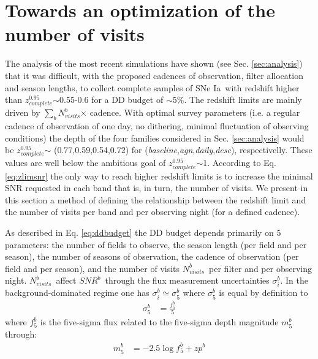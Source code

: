 \documentclass[\docopts]{\docclass}
\newcommand{\snrb}{\mbox{$SNR^b$}}
\newcommand{\sne}{{SNe Ia}}
\newcommand{\zcompb}{\mbox{$z_{complete}^{0.95}$}}
\newcommand{\per}{$\%$}
\newcommand{\seq}{$\sim$}
\newcommand{\nvisitsb}{\mbox{$N_{visits}^b$}}
\newcommand{\sumnvisitsb}{\mbox{$\sum\limits_{b}N_{visits}^b$}}
\newcommand{\osfamily}[1]{{\it #1}}
\begin{document}
\section{Towards an optimization of the number of visits}
\label{sec:opti}

The analysis of the most recent simulations have shown (see Sec. \ref{sec:analysis}) that it was difficult, with the proposed cadences of observation, filter allocation and season lengths, to collect complete samples of \sne~with redshift higher than \zcompb\seq 0.55-0.6 for a DD budget of \seq 5\per.  %
The redshift limits are mainly driven by \sumnvisitsb$\times$ cadence. With optimal survey parameters (i.e. a regular cadence of observation of one day, no dithering, minimal fluctuation of observing conditions) the depth of the four families considered in Sec. \ref{sec:analysis} would be \zcompb $\sim$ (0.77,0.59,0.54,0.72) for (\osfamily{baseline},\osfamily{agn},\osfamily{daily},\osfamily{desc}), respectivelly. These values are well below the ambitious goal of \zcompb\seq1. According to Eq. \ref{eq:zlimsnr} the only way to reach higher redshift limits is to increase the minimal SNR requested in each band that is, in turn, the number of visits. We present in this section a method of defining the relationship between the redshift limit and the number of visits per band and per observing night (for a defined cadence). 
\par
As described in Eq. \ref{eq:ddbudget} the DD budget depends primarily on 5 parameters: the number of fields to observe, the season length (per field and per season), the number of seasons of observation, the cadence of observation (per field and per season), and the number of visits \nvisitsb~per filter and per observing night. \nvisitsb~affect \snrb~through the flux measurement uncertainties  $\sigma_i^b$. In the background-dominated regime one has $\sigma_i^b \simeq \sigma_5^b$ where $\sigma_5^b$ is equal by definition to
\begin{equation}
  \begin{aligned}
    \sigma_5^b &=  \frac{f_5^b}{5}
    \end{aligned}
\end{equation}
where $f_ 5^b$ is the five-sigma flux related to the five-sigma depth magnitude $m_5^b$ through:
\begin{equation}
  \begin{aligned}
    m_5^b &= -2.5 \log f_5^b+zp^b
    \end{aligned}
\end{equation}
\end{document}
